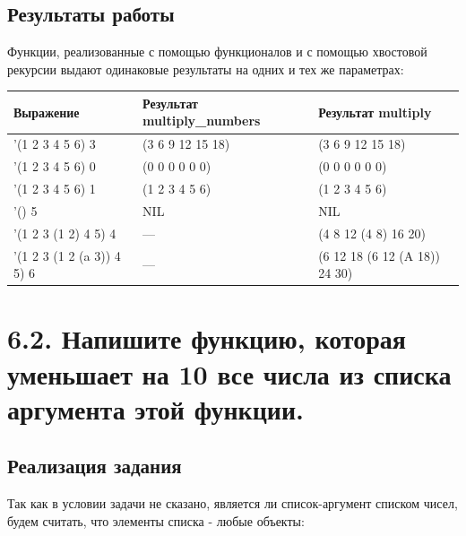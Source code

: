 \documentclass[a4paper,12pt]{article}
\begin{document}
 	\subsection*{Результаты работы}
 	
 	 	Функции, реализованные с помощью функционалов и с помощью хвостовой рекурсии выдают одинаковые результаты на одних и тех же параметрах:
 	
 	\begin{table} [h!]
 		\begin{center}
 			\begin{tabular}{|l|l|l|}
 				\hline
 				{\bf  Выражение} & {\bf Результат multiply\_numbers} & {\bf Результат multiply} \\
 				\hline
 				{'(1 2 3 4 5 6) 3} & (3 6 9 12 15 18) & (3 6 9 12 15 18)\\
 				\hline
 				{'(1 2 3 4 5 6) 0} & (0 0 0 0 0 0) & (0 0 0 0 0 0)\\
 				\hline
 				{'(1 2 3 4 5 6) 1} & (1 2 3 4 5 6) & (1 2 3 4 5 6)\\
 				\hline
 				{'() 5} & NIL & NIL\\
 				\hline
 				{'(1 2 3 (1 2) 4 5) 4} & --- & (4 8 12 (4 8) 16 20)\\
 				\hline 
 				{'(1 2 3 (1 2 (a 3)) 4 5) 6} & --- & (6 12 18 (6 12 (A 18)) 24 30)\\
 				\hline
 			\end{tabular}  
 			\label{m2}
 		\end{center}
 	\end{table}
 	
 	
 	\newpage
 	
 	\section*{6.2. Напишите функцию, которая уменьшает на 10 все числа из списка
аргумента этой функции.
 	}
 	
 	\subsection*{Реализация задания}
 	
 	Так как в условии задачи не сказано, является ли список-аргумент списком чисел, будем считать, что элементы списка - любые объекты:
 	
\end{document}
